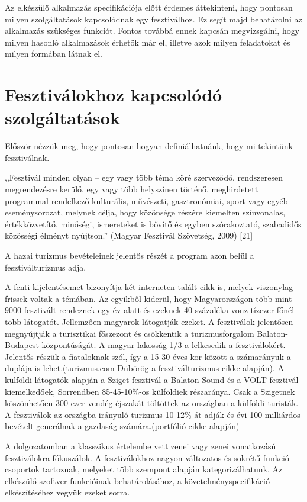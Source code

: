 
Az elkészülő alkalmazás specifikációja előtt érdemes áttekinteni, hogy pontosan milyen szolgáltatások kapcsolódnak egy fesztiválhoz. Ez segít majd behatárolni az alkalmazás szükséges funkciót. Fontos továbbá ennek kapcsán megvizsgálni, hogy milyen hasonló alkalmazások érhetők már el, illetve azok milyen feladatokat és milyen formában látnak el.

\section{Fesztiválokhoz kapcsolódó szolgáltatások}

Először nézzük meg, hogy pontosan hogyan definiálhatnánk, hogy mi tekintünk fesztiválnak.

,,Fesztivál minden olyan – egy vagy több téma köré szerveződő, rendszeresen megrendezésre kerülő, egy vagy több helyszínen történő, meghirdetett programmal rendelkező kulturális, művészeti, gasztronómiai, sport vagy egyéb – eseménysorozat, melynek célja, hogy közönsége részére kiemelten színvonalas, értékközvetítő, minőségi, ismereteket is bővítő és egyben szórakoztató, szabadidős közösségi élményt nyújtson.'' (Magyar Fesztivál Szövetség, 2009) [21]

A hazai turizmus bevételeinek jelentős részét a program azon belül a fesztiválturizmus adja.

A fenti kijelentésemet bizonyítja két interneten talált cikk is, melyek viszonylag frissek voltak a témában. Az egyikből kiderül, hogy Magyarországon több mint 9000 fesztivált rendeznek egy év alatt és ezeknek 40 százaléka vonz tízezer főnél több látogatót. Jellemzően magyarok látogatják ezeket. A fesztiválok jelentősen megnyújtják a turisztikai főszezont és csökkentik a turizmusforgalom Balaton-Budapest központúságát. A magyar lakosság 1/3-a lelkesedik a fesztiválokért. Jelentős részük a fiataloknak szól, így a 15-30 éves kor között a számarányuk a duplája is lehet.(turizmus.com Dübörög a fesztiválturizmus cikke alapján). 
A külföldi látogatók alapján a Sziget fesztivál a Balaton Sound és a VOLT fesztivál kiemelkedőek, Sorrendben 85-45-10\%-os külföldiek részaránya. Csak a Szigetnek köszönhetően 300 ezer vendég éjszakát töltöttek az országban a külföldi turisták. A fesztiválok az országba irányuló turizmus 10-12\%-át adják és évi 100 milliárdos bevételt generálnak a gazdaság számára.(portfólió cikke alapján)

A dolgozatomban a klasszikus értelembe vett zenei vagy zenei vonatkozású fesztiválokra fókuszálok.
A fesztiválokhoz nagyon változatos és sokrétű funkció csoportok tartoznak, melyeket több szempont alapján kategorizálhatunk. Az elkészülő szoftver funkcióinak behatárolásához, a követelményspecifikáció elkészítéséhez vegyük ezeket sorra.

